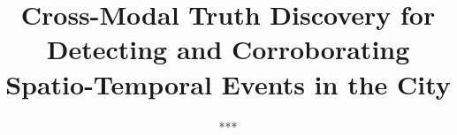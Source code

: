 \documentclass{sig-alternate-05-2015}
\begin{document}
\conferenceinfo{}{}

\title{Cross-Modal Truth Discovery for Detecting and Corroborating Spatio-Temporal Events in the City}

\author{
\alignauthor
***\\
       \\
       \\
       \\
}


\maketitle

\begin{abstract}

\end{abstract}













\small
\end{document}
